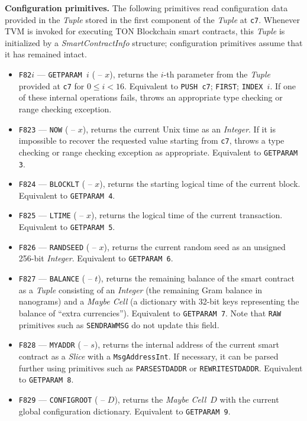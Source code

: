 \documentclass[12pt,oneside]{article}
\def\makepoint#1{\medbreak\noindent{\bf #1.\ }}
\def\nxsubpoint{\refstepcounter{subsubsection}%
    \smallbreak\makepoint{\thesubsubsection}}
\def\emb#1{\textbf{#1.}}
\begin{document}
\nxsubpoint\emb{Configuration primitives}\label{sp:prim.conf.param}
The following primitives read configuration data provided in the {\em Tuple\/} stored in the first component of the {\em Tuple\/} at {\tt c7}. Whenever TVM is invoked for executing TON Blockchain smart contracts, this {\em Tuple\/} is initialized by a {\em SmartContractInfo\/} structure; configuration primitives assume that it has remained intact.
\begin{itemize}
\item {\tt F82$i$} --- {\tt GETPARAM $i$} ( -- $x$), returns the $i$-th parameter from the {\em Tuple\/} provided at {\tt c7} for $0\leq i<16$. Equivalent to {\tt PUSH c7}; {\tt FIRST}; {\tt INDEX $i$}. If one of these internal operations fails, throws an appropriate type checking or range checking exception.
\item {\tt F823} --- {\tt NOW} ( -- $x$), returns the current Unix time as an {\em Integer}. If it is impossible to recover the requested value starting from {\tt c7}, throws a type checking or range checking exception as appropriate. Equivalent to {\tt GETPARAM 3}.
\item {\tt F824} --- {\tt BLOCKLT} ( -- $x$), returns the starting logical time of the current block. Equivalent to {\tt GETPARAM 4}.
\item {\tt F825} --- {\tt LTIME} ( -- $x$), returns the logical time of the current transaction. Equivalent to {\tt GETPARAM 5}.
\item {\tt F826} --- {\tt RANDSEED} ( -- $x$), returns the current random seed as an unsigned 256-bit {\em Integer}. Equivalent to {\tt GETPARAM 6}.
\item {\tt F827} --- {\tt BALANCE} ( -- $t$), returns the remaining balance of the smart contract as a {\em Tuple\/} consisting of an {\em Integer} (the remaining Gram balance in nanograms) and a {\em Maybe Cell} (a dictionary with 32-bit keys representing the balance of ``extra currencies''). Equivalent to {\tt GETPARAM 7}. Note that {\tt RAW} primitives such as {\tt SENDRAWMSG} do not update this field.
\item {\tt F828} --- {\tt MYADDR} ( -- $s$), returns the internal address of the current smart contract as a {\em Slice\/} with a {\tt MsgAddressInt}. If necessary, it can be parsed further using primitives such as {\tt PARSESTDADDR} or {\tt REWRITESTDADDR}. Equivalent to {\tt GETPARAM 8}.
\item {\tt F829} --- {\tt CONFIGROOT} ( -- $D$), returns the {\em Maybe Cell\/}~$D$ with the current global configuration dictionary. Equivalent to {\tt GETPARAM 9}.

\end{itemize}
\end{document}
